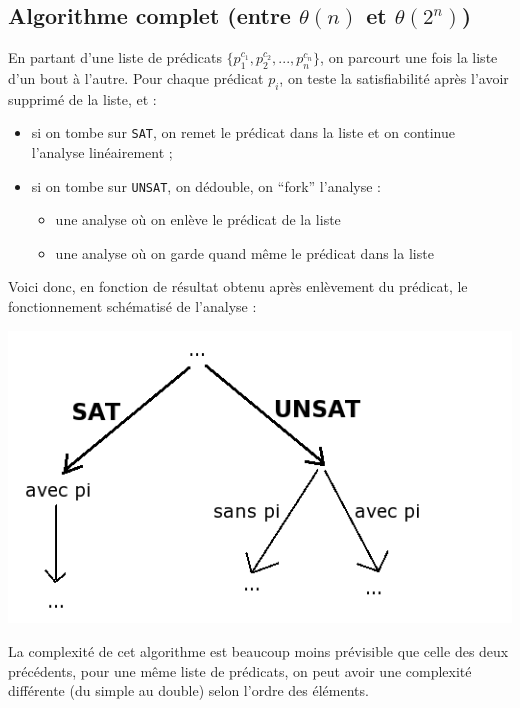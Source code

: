 \documentclass[french]{article}
\newcommand\SAT{\texttt{SAT}}
\newcommand\UNSAT{\texttt{UNSAT}}
\begin{document}
  \subsection{Algorithme complet (entre $\theta(n)$ et $\theta(2^n)$)}
  En partant d’une liste de prédicats $\{p_1^{c_1}, p_2^{c_2}, ..., p_n^{c_n}\}$, on parcourt une fois la liste d’un bout à l’autre. Pour chaque prédicat $p_i$, on teste la satisfiabilité après l’avoir supprimé de la liste, et :
  \begin{itemize}
    \item si on tombe sur \SAT, on remet le prédicat dans la liste et on continue l’analyse linéairement ;
    \item si on tombe sur \UNSAT, on dédouble, on ``fork'' l’analyse :
    \begin{itemize}
      \item une analyse où on enlève le prédicat de la liste
      \item une analyse où on garde quand même le prédicat dans la liste
    \end{itemize}
  \end{itemize}

  Voici donc, en fonction de résultat obtenu après enlèvement du prédicat, le fonctionnement schématisé de l'analyse :

  \begin{center}
    \includegraphics[scale=0.7]{./pictures/alg3.png}
  \end{center}

  La complexité de cet algorithme est beaucoup moins prévisible que celle des deux précédents, pour une même liste de prédicats, on peut avoir une complexité différente (du simple au double) selon l'ordre des éléments.
\end{document}
